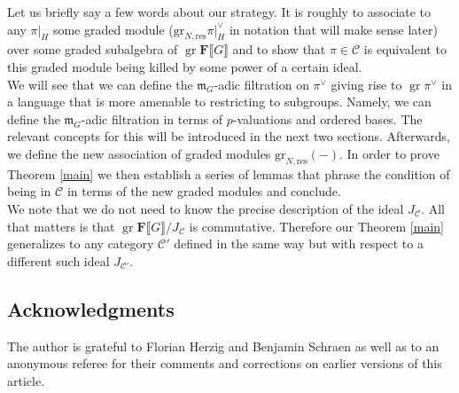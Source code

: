 \documentclass[11pt, oneside]{article}
\newcommand{\gres}{\text{gr}_{N,\text{res}}}
\DeclareMathOperator{\gr}{gr}
\theoremstyle{definition}
\begin{document}
	Let us briefly say a few words about our strategy. It is roughly to associate to any $\pi|_H$ some graded module ($\gres\pi|_H^\vee$ in notation that will make sense later) over some graded subalgebra of $\gr\mathbf F\llbracket G\rrbracket$ and to show that $\pi\in\mathcal C$ is equivalent to this graded module being killed by some power of a certain ideal.\\
	We will see that we can define the $\mathfrak m_G$-adic filtration on $\pi^\vee$ giving rise to $\gr\pi^\vee$ in a language that is more amenable to restricting to subgroups. Namely, we can define the $\mathfrak m_G$-adic filtration in terms of $p$-valuations and ordered bases. The relevant concepts for this will be introduced in the next two sections. Afterwards, we define the new association of graded modules $\gres(-)$. In order to prove Theorem \ref{main} we then establish a series of lemmas that phrase the condition of being in $\mathcal C$ in terms of the new graded modules and conclude.\\
	We note that we do not need to know the precise description of the ideal $J_{\mathcal C}$. All that matters is that $\gr\mathbf F\llbracket G\rrbracket/J_{\mathcal C}$ is commutative. Therefore our Theorem \ref{main} generalizes to any category $\mathcal C'$ defined in the same way but with respect to a different such ideal $J_{\mathcal C'}$.
		\subsection*{Acknowledgments}
	The author is grateful to Florian Herzig and Benjamin Schraen as well as to an anonymous referee for their comments and corrections on earlier versions of this article.
\end{document}

